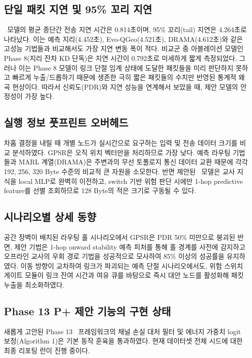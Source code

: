 \subsection{단일 패킷 지연 및 95\% 꼬리 지연}
\phaseTwelve\ 모델의 평균 종단간 전송 지연 시간은 0.814초이며, 95\% 꼬리(tail) 지연은 4.264초로 나타났다. 이는 예측 지리(4.452초), Evo-QGeo(4.521초), DRAMA(4.612초)와 같은 고성능 기법들과 비교해서도 가장 지연 변동 폭이 적다. 
비교군 중 아블레이션 모델인 Phase 8(지리 잔차 KD 단독)은 지연 시간이 0.792초로 미세하게 짧게 측정되었다. 그러나 이는 Phase 8 모델이 링크 단절 임계 상태에 도달한 패킷들을 미리 판단하지 못하고 빠르게 누출/드롭하기 때문에 생존한 극히 짧은 패킷들의 수치만 반영된 통계적 왜곡 현상이다. 따라서 신뢰도(PDR)와 지연 성능을 연계해서 보았을 때, 제안 모델의 안정성이 가장 높다.

\subsection{실행 정보 풋프린트 오버헤드}
차홉 결정을 내릴 때 개별 노드가 실시간으로 요구하는 입력 및 전송 데이터 크기를 비교 분석하였다. GPSR은 오직 위치 벡터만을 처리하므로 가장 낮다. 예측 라우팅 기법들과 MARL 계열(DRAMA)은 주변과의 무선 토폴로지 통신 데이터 교환 때문에 각각 192, 256, 320 Byte 수준의 비교적 큰 자원을 소모한다. 반면 제안된 \phaseTwelve\ 모델은 교사 지식을 local MLP로 완벽히 이전하고, switch 기반 위험 판단 시에만 1-hop predictive feature를 선별 조회하므로 128 Byte의 적은 크기로 구동될 수 있다.

\subsection{시나리오별 상세 동향}
공간 장벽이 배치된 라우팅 홀 시나리오에서 GPSR은 PDR 50\% 미만으로 붕괴된 반면, 제안 기법은 1-hop onward stability 예측 피처를 통해 홀 경계를 사전에 감지하고 오프라인 교사의 우회 경로 기법을 성공적으로 모사하여 85\% 이상의 성공률을 유지하였다.
이동 방향이 교차하여 링크가 파괴되는 예측 단절 시나리오에서도, 위험 스위치 게이트 모듈이 링크 잔여 시간과 여유 큐를 바탕으로 즉시 대안 노드를 활성화해 패킷 누출을 최소화하였다.

\subsection{Phase 13 P+ 제안 기능의 구현 상태}
새롭게 고안된 Phase 13 \method\ 프레임워크의 채널 손실 대처 필터 및 에너지 가중치 logit 보정(Algorithm 1)은 기본 동작 훈육을 통과하였다. 현재 데이터셋 전체 시드에 대한 최종 리포팅 런이 진행 중이다.
